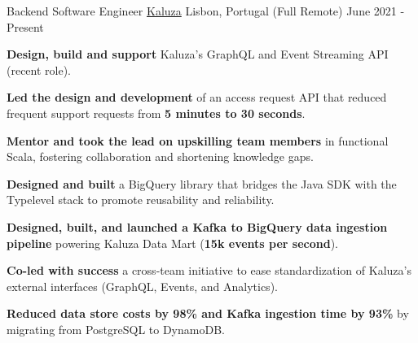 
\begin{cventries}
  \vspace{-2mm}
  \cventry
    {Backend Software Engineer}
    {\href{https://www.kaluza.com/}{Kaluza}}
    {Lisbon, Portugal (Full Remote)}
    {June 2021 - Present}
    {
      \begin{cvitems}
        \item \textbf{Design, build and support} Kaluza's GraphQL and Event Streaming API (recent role).
        \item \textbf{Led the design and development} of an access request API that reduced frequent support requests from \textbf{5 minutes to 30 seconds}.
        \item \textbf{Mentor and took the lead on upskilling team members} in functional Scala, fostering collaboration and shortening knowledge gaps.
        \item \textbf{Designed and built} a BigQuery library that bridges the Java SDK with the Typelevel stack to promote reusability and reliability. 
        \item \textbf{Designed, built, and launched a Kafka to BigQuery data ingestion pipeline} powering Kaluza Data Mart (\textbf{15k events per second}).
        \item \textbf{Co-led with success} a cross-team initiative to ease standardization of Kaluza's external interfaces (GraphQL, Events, and Analytics).
        \item \textbf{Reduced data store costs by 98\% and Kafka ingestion time by 93\%} by migrating from PostgreSQL to DynamoDB.  %
      \end{cvitems}
      \vspace{4mm}
    }


\end{cventries}

